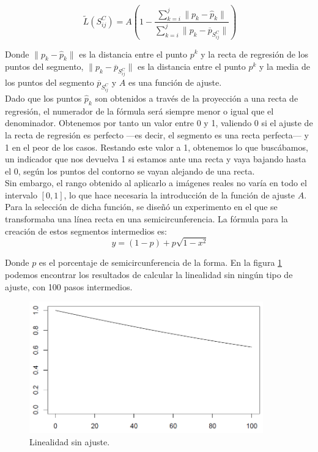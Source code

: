\[
\ \tilde{L} \left(S^C_{ij}\right) = A \left( 1-\frac{\sum^j_{k=i} \parallel p_k - \widehat{p}_k \parallel}{\sum^j_{k=i} \parallel p_k - \overline{p}_{S^C_{ij}} \parallel} \right)
\]

Donde $\parallel p_k - \widehat{p}_k \parallel$ es la distancia entre el punto $p^k$ y la recta de regresión de los puntos del segmento, $\parallel p_k - \overline{p}_{S^C_{ij}} \parallel$ es la distancia entre el punto $p^k$ y la media de los puntos del segmento $\overline{p}_{S^C_{ij}}$ y $A$ es una función de ajuste.\\

Dado que los puntos $\widehat{p}_k$ son obtenidos a través de la proyección a una recta de regresión, el numerador de la fórmula será siempre menor o igual que el denominador. Obtenemos por tanto un valor entre 0 y 1, valiendo 0 si el ajuste de la recta de regresión es perfecto ---es decir, el segmento es una recta perfecta--- y 1 en el peor de los casos. Restando este valor a 1, obtenemos lo que buscábamos, un indicador que nos devuelva 1 si estamos ante una recta y vaya bajando hasta el 0, según los puntos del contorno se vayan alejando de una recta.\\

Sin embargo, el rango obtenido al aplicarlo a imágenes reales no varía en todo el intervalo $\left[ 0,1 \right]$, lo que hace necesaria la introducción de la función de ajuste $A$. Para la selección de dicha función, se diseñó un experimento en el que se transformaba una línea recta en una semicircunferencia. La fórmula para la creación de estos segmentos intermedios es:\\

\[
\ y = (1-p)+ p \sqrt{1-x^2}
\]

Donde $p$ es el porcentaje de semicircunferencia de la forma. En la figura \ref{fig2} podemos encontrar los resultados de calcular la linealidad sin ningún tipo de ajuste, con 100 pasos intermedios.\\

\begin{figure}[H]
\begin{center}

\includegraphics[width=0.9\textwidth]{img/linea-curva.png}
\end{center}

\caption{Linealidad sin ajuste.}
\label{fig2}
\end{figure}

